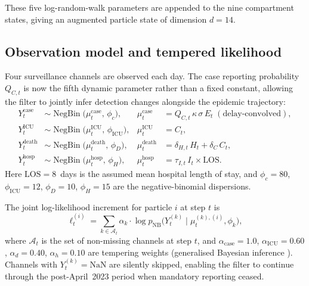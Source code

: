 \documentclass[11pt]{article}
\newcommand{\NegBin}{\operatorname{NegBin}}
\begin{document}
These five log-random-walk parameters are appended to the nine compartment
states, giving an augmented particle state of dimension $d=14$.

\subsection{Observation model and tempered likelihood}
\label{sec:obs}

Four surveillance channels are observed each day.  The case reporting
probability $Q_{C,t}$ is now the fifth dynamic parameter rather than a fixed
constant, allowing the filter to jointly infer detection changes alongside
the epidemic trajectory:
\begin{align}
  Y_t^{\mathrm{case}}
    &\sim \NegBin\!\bigl(\mu_t^{\mathrm{case}},\,\phi_c\bigr),
  &\mu_t^{\mathrm{case}}
    &= Q_{C,t}\,\kappa\,\sigma\,E_t\;(\text{delay-convolved}), \label{eq:obs_case}\\
  Y_t^{\mathrm{ICU}}
    &\sim \NegBin\!\bigl(\mu_t^{\mathrm{ICU}},\,\phi_{\mathrm{ICU}}\bigr),
  &\mu_t^{\mathrm{ICU}}
    &= C_t, \label{eq:obs_icu}\\
  Y_t^{\mathrm{death}}
    &\sim \NegBin\!\bigl(\mu_t^{\mathrm{death}},\,\phi_D\bigr),
  &\mu_t^{\mathrm{death}}
    &= \delta_{H,t}\,H_t + \delta_C\,C_t, \label{eq:obs_death}\\
  Y_t^{\mathrm{hosp}}
    &\sim \NegBin\!\bigl(\mu_t^{\mathrm{hosp}},\,\phi_H\bigr),
  &\mu_t^{\mathrm{hosp}}
    &= \tau_{I,t}\,I_t\times\mathrm{LOS}. \label{eq:obs_hosp}
\end{align}
Here $\mathrm{LOS}=8$~days is the assumed mean hospital length of stay, and
$\phi_c=80$, $\phi_{\mathrm{ICU}}=12$, $\phi_D=10$, $\phi_H=15$ are the
negative-binomial dispersions.

The joint log-likelihood increment for particle $i$ at step $t$ is
\begin{equation}
  \ell_t^{(i)} = \sum_{k\in\mathcal{A}_t}
    \alpha_k \cdot
    \log p_{\mathrm{NB}}\!\bigl(Y_t^{(k)}\mid\mu_t^{(k),(i)},\phi_k\bigr),
  \label{eq:loglik}
\end{equation}
where $\mathcal{A}_t$ is the set of non-missing channels at step $t$,
and $\alpha_{\mathrm{case}}=1.0$, $\alpha_{\mathrm{ICU}}=0.60$,
$\alpha_d=0.40$, $\alpha_h=0.10$ are tempering weights
(generalised Bayesian inference \cite{grunwald2017}).
Channels with $Y_t^{(k)}=\mathrm{NaN}$ are silently skipped,
enabling the filter to continue through the post-April~2023 period
when mandatory reporting ceased.
\end{document}
